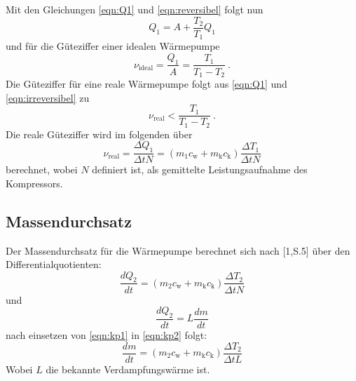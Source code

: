 Mit den Gleichungen \ref{eqn:Q1} und \ref{eqn:reversibel} folgt nun
\begin{equation}
	Q_\text{1} = A + \frac{T_\text{2}}{T_\text{1}} Q_\text{1}
\end{equation}
und für die Güteziffer einer idealen Wärmepumpe
\begin{equation}
	\nu_\text{ideal} = \frac{Q_\text{1}}{A} = \frac{T_\text{1}}{T_\text{1} - T_\text{2}} \ .
	\label{eqn:nuideal}
\end{equation}
Die Güteziffer für eine reale Wärmepumpe folgt aus \ref{eqn:Q1} und \ref{eqn:irreversibel} zu
\begin{equation}
	\nu_\text{real} < \frac{T_\text{1}}{T_\text{1} - T_\text{2}} \ .
\end{equation}
Die reale Güteziffer wird im folgenden über
\begin{equation}
	\nu_\text{real} = \frac{\Delta Q_\text{1}}{\Delta t N} = (m_\text{1} c_\text{w} + m_\text{k} c_\text{k}) \frac{\Delta T_\text{1}}{\Delta t N}
	\label{eqn:nureal}
\end{equation}
berechnet, wobei $N$ definiert ist, als gemittelte Leistungsaufnahme des Kompressors.

\subsection{Massendurchsatz}
Der Massendurchsatz für die Wärmepumpe berechnet sich nach [1,S.5] über den Differentialquotienten:
\begin{equation}
	\label{eqn:kp1}
	\frac{d Q_\text{2}}{d t} = (m_\text{2} c_\text{w} + m_\text{k} c_\text{k}) \frac{\Delta T_\text{2}}{\Delta t N}
\end{equation}
und
\begin{equation}
	\label{eqn:kp2}
	\frac{d Q_\text{2}}{d t} = L \frac{d m}{d t}
\end{equation}
nach einsetzen von \ref{eqn:kp1} in \ref{eqn:kp2} folgt:
\begin{equation}
	\frac{dm}{dt} = (m_\text{2} c_\text{w} + m_\text{k} c_\text{k}) \frac{\Delta T_\text{2}}{\Delta t L}
	\label{eqn:dm/dt}
\end{equation}
Wobei $L$ die bekannte Verdampfungswärme ist.

